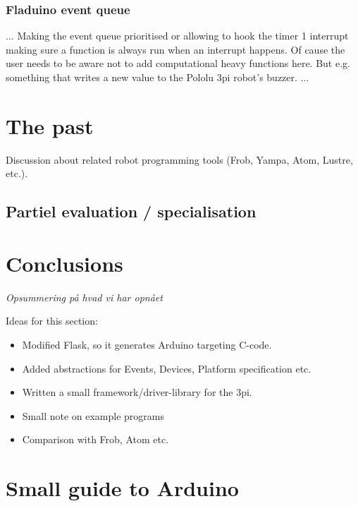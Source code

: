 \documentclass[a4paper, oneside, final]{memoir}
\begin{document}
\subsection{Fladuino event queue}
\label{sec:fladuino-event-queue}
$\ldots$
Making the event queue prioritised or allowing to hook the timer 1 interrupt
making sure a function is always run when an interrupt happens. Of cause the
user needs to be aware not to add computational heavy functions here. But
e.g. something that writes a new value to the Pololu 3pi robot's buzzer.
$\ldots$

\chapter{The past}
Discussion about related robot programming tools (Frob, Yampa, Atom,
Lustre, etc.).

\section{Partiel evaluation / specialisation} 

\chapter{Conclusions}
\textit{Opsummering på hvad vi har opnået}

Ideas for this section:
\begin{itemize}
\item Modified Flask, so it generates Arduino targeting C-code.
\item Added abstractions for Events, Devices, Platform specification etc.
\item Written a small framework/driver-library for the 3pi.
\item Small note on example programs
\item Comparison with Frob, Atom etc.
\end{itemize}





\appendix

\chapter{Small guide to Arduino}

\end{document}
